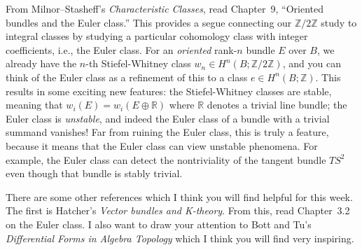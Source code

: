 \documentclass{homework}
\author{Jim Fowler}
\date{Week 7: Euler class}
\begin{document}
\maketitle

From Milnor--Stasheff's \textit{Characteristic Classes}, read
Chapter~9, ``Oriented bundles and the Euler class.''  This provides a
segue connecting our $\mathbb{Z}/2\mathbb{Z}$ study to integral
classes by studying a particular cohomology class with integer
coefficients, i.e., the Euler class.  For an \textit{oriented}
rank-$n$ bundle $E$ over $B$, we already have the $n$-th
Stiefel-Whitney class $w_n \in H^n(B;\mathbb{Z}/2\mathbb{Z})$, and you
can think of the Euler class as a refinement of this to a class
$e \in H^n(B;\mathbb{Z})$.  This results in some exciting new
features: the Stiefel-Whitney classes are stable, meaning that
$w_i(E) = w_i(E \oplus \mathbb{R})$ where $\mathbb{R}$ denotes a
trivial line bundle; the Euler class is \textit{unstable}, and indeed
the Euler class of a bundle with a trivial summand vanishes!  Far from
ruining the Euler class, this is truly a feature, because it means
that the Euler class can view unstable phenomena.  For example, the
Euler class can detect the nontriviality of the tangent bundle $TS^2$
even though that bundle is stably trivial.

There are some other references which I think you will find helpful
for this week.  The first is Hatcher's \textit{Vector bundles and
  K-theory}.  From this, read Chapter~3.2 on the Euler class.  I also
want to draw your attention to Bott and Tu's \textit{Differential
  Forms in Algebra Topology} which I think you will find very
inspiring.
\end{document}
